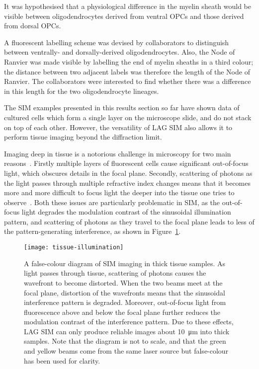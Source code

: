 It was hypothesised that a physiological difference in the myelin sheath would be visible between oligodendrocytes derived from ventral OPCs and those derived from dorsal OPCs. 

A fluorescent labelling scheme was devised by collaborators to distinguish between ventrally- and dorsally-derived oligodendrocytes. 
Also, the Node of Ranvier was made visible by labelling the end of myelin sheaths in a third colour; the distance between two adjacent labels was therefore the length of the Node of Ranvier. 
The collaborators were interested to find whether there was a difference in this length for the two oligodendrocyte lineages. 

The SIM examples presented in this results section so far have shown data of cultured cells which form a single layer on the microscope slide, and do not stack on top of each other. 
However, the versatility of LAG SIM also allows it to perform tissue imaging beyond the diffraction limit. 

Imaging deep in tissue is a notorious challenge in microscopy for two main reasons~\cite{wimmer2010high}. 
Firstly multiple layers of fluorescent cells cause significant out-of-focus light, which obscures details in the focal plane.
Secondly, scattering of photons as the light passes through multiple refractive index changes means that it becomes more and more difficult to focus light the deeper into the tissue one tries to observe~\cite{jacques2013optical}. 
Both these issues are particularly problematic in SIM, as the out-of-focus light degrades the modulation contrast of the sinusoidal illumination pattern, and scattering of photons as they travel to the focal plane leads to less of the pattern-generating interference, as shown in Figure~\ref{fig:tissue-illumination}. 

\begin{figure}[htbp!]
\centering
\texttt{[image: tissue-illumination]}
\caption[LAG SIM: Imaging in tissue degrades the SIM pattern due to photon scattering and out-of-focus light]{A false-colour diagram of SIM imaging in thick tissue samples. 
As light passes through tissue, scattering of photons causes the wavefront to become distorted. When the two beams meet at the focal plane, distortion of the wavefronts means that the sinusoidal interference pattern is degraded. Moreover, out-of-focus light from fluorescence above and below the focal plane further reduces the modulation contrast of the interference pattern. Due to these effects, LAG SIM can only produce reliable images about \SI{10}{\micro\metre} into thick samples. Note that the diagram is not to scale, and that the green and yellow beams come from the same laser source but false-colour has been used for clarity. }
\label{fig:tissue-illumination}
\end{figure}

